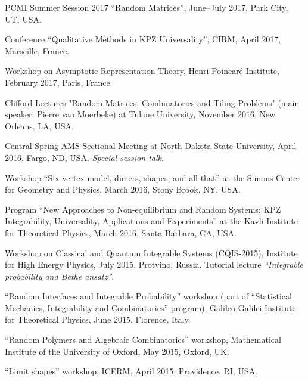 \documentclass[letterpaper,11pt]{article}
\begin{document}
\begin{etaremune}
	\item
	      PCMI Summer Session 2017 ``Random Matrices'', June--July 2017,
	      Park City, UT, USA.

	\item
	      Conference ``Qualitative Methods in KPZ Universality'', CIRM,
	      April 2017, Marseille, France.

	\item
	      Workshop on Asymptotic Representation Theory, Henri Poincar\'e
	      Institute, February 2017, Paris, France.

	\item
	      Clifford Lectures "Random Matrices, Combinatorics and Tiling
	      Problems" (main speaker: Pierre van Moerbeke) at Tulane University, November
	      2016, New Orleans, LA, USA.

	\item
	      Central Spring AMS Sectional Meeting at North Dakota State
	      University, April 2016, Fargo, ND, USA. \emph{Special session talk}.

	\item
	      Workshop ``Six-vertex model, dimers, shapes, and all that'' at
	      the Simons Center for Geometry and Physics, March 2016, Stony Brook, NY, USA.

	\item
	      Program ``New Approaches to Non-equilibrium and Random Systems:
	      KPZ Integrability, Universality, Applications and Experiments'' at the Kavli
	      Institute for Theoretical Physics, March 2016, Santa Barbara, CA, USA.

	\item
	      Workshop on Classical and Quantum Integrable Systems
	      (CQIS-2015), Institute for High Energy Physics, July 2015, Protvino, Russia.
	      Tutorial lecture \emph{``Integrable probability and Bethe   ansatz''}.

	\item
	      ``Random Interfaces and Integrable Probability'' workshop (part
	      of ``Statistical Mechanics, Integrability and Combinatorics''
	      program), Galileo Galilei Institute for Theoretical Physics, June 2015,
	      Florence, Italy.

	\item
	      ``Random Polymers and Algebraic Combinatorics'' workshop,
	      Mathematical Institute of the University of Oxford, May 2015,
	      Oxford, UK.

	\item
	      ``Limit shapes'' workshop, ICERM, April 2015, Providence, RI,
	      USA.   %


\end{etaremune}
\end{document}
